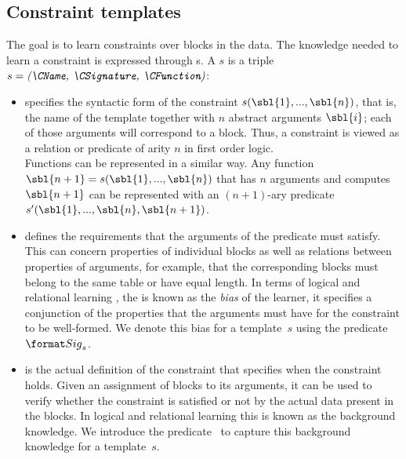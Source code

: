 \subsection{Constraint templates}
The goal is to learn constraints over blocks in the data. The knowledge needed to learn a constraint is expressed through {\template}s.
%
A \template $s$ is a triple $s = \textit{(\CName, \CSignature, \CFunction)}$:
\begin{itemize}
\item
\textit{\CName}  specifies the syntactic form of the constraint $s(\sbl{1}, ...,\sbl{n})$, that is, the name of the template together
with $n$ abstract arguments $\sbl{i}$; each of those arguments will correspond to a block.
Thus, a constraint is viewed as a relation or predicate of arity $n$ in first order logic.\\
Functions can be represented in a similar way. Any function $\sbl{n+1}=s(\sbl{1},...,\sbl{n})$ that has $n$ arguments and computes $\sbl{n+1}$ can be represented with an $(n{+}1)$-ary predicate $s'(\sbl{1},...,\sbl{n},\sbl{n+1})$.

\item \textit{\CSignature} defines the requirements that the arguments of the predicate must satisfy.
This can concern properties of individual blocks as well as relations between properties of arguments, for example, that the corresponding blocks must belong to the same table or have equal length.
In terms of logical and relational learning \cite{luc_book}, the \CSignature is known as the {\em bias} of the learner, it specifies a conjunction of the properties that the arguments must have for the constraint to be well-formed.
We denote this bias for a template~$s$ using the predicate $\sigc$.
\item \textit{\CFunction} is the actual definition of the constraint that specifies when the constraint holds.
Given an assignment of blocks to its arguments, it can be used to verify whether the constraint is satisfied or not by the actual data present in the blocks. %
In logical and relational learning this is known as the background knowledge.
We introduce the predicate ~to capture this background knowledge for a template~$s$.
\end{itemize}

